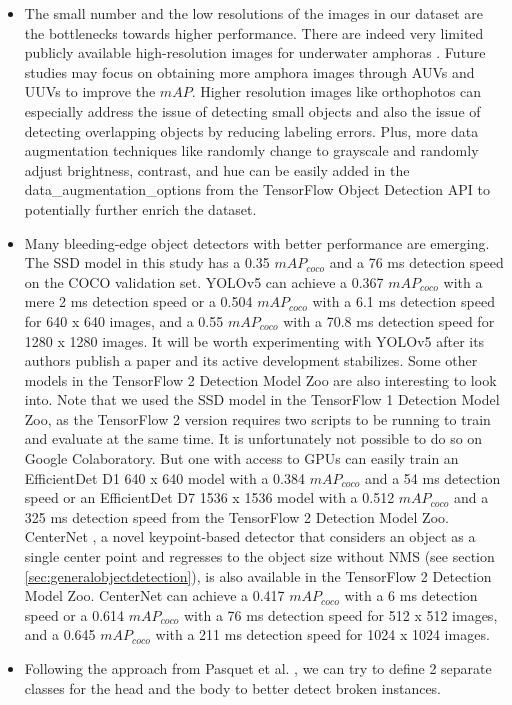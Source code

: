 \documentclass[a4paper, 11pt, oneside]{article}
\begin{document}
\begin{itemize}
  \item The small number and the low resolutions of the images in our dataset are the bottlenecks towards higher
  performance. There are indeed very limited publicly available high-resolution images for underwater amphoras
  \cite{pasquet2017amphora}. Future studies may focus on obtaining more amphora images through AUVs and UUVs to improve
  the $mAP$. Higher resolution images like orthophotos can especially address the issue of detecting
  small objects \cite{kisantal2019augmentation} and also the issue of detecting overlapping objects by reducing labeling
  errors. Plus, more data augmentation techniques like randomly change to grayscale and randomly adjust brightness,
  contrast, and hue can be easily added in the data\_augmentation\_options from the TensorFlow Object Detection API
  to potentially further enrich the dataset.
  \item Many bleeding-edge object detectors with better performance are emerging. The SSD model in this study
  has a 0.35 $mAP_{coco}$ and a 76 ms detection speed on the COCO validation set. YOLOv5 can achieve a 0.367
  $mAP_{coco}$ with a mere 2 ms detection speed or a 0.504 $mAP_{coco}$ with a 6.1 ms detection speed for 640 x 640 images,
  and a 0.55 $mAP_{coco}$ with a 70.8 ms detection speed for 1280 x 1280 images. It will be worth experimenting with
  YOLOv5 after its authors publish a paper and its active development stabilizes. Some other models in the TensorFlow 2
  Detection Model Zoo \cite{tf2detectionmodelzoo} are also interesting to look into. Note that we used the SSD
  model in the TensorFlow 1 Detection Model Zoo, as the TensorFlow 2 version requires two scripts to be running
  to train and evaluate at the same time. It is unfortunately not possible to do so on Google Colaboratory. But one with
  access to GPUs can easily train an EfficientDet \cite{tan2020efficientdet} D1 640 x 640 model with a 0.384 $mAP_{coco}$
  and a 54 ms detection speed or an EfficientDet D7 1536 x 1536 model with a 0.512 $mAP_{coco}$ and a 325 ms detection
  speed from the TensorFlow 2 Detection Model Zoo. CenterNet \cite{zhou2019objects}, a novel keypoint-based detector that
  considers an object as a single center point and regresses to the object size without NMS
  (see section \ref{sec:generalobjectdetection}), is also available in the TensorFlow 2 Detection Model Zoo. CenterNet
  can achieve a 0.417 $mAP_{coco}$ with a 6 ms detection speed or a 0.614 $mAP_{coco}$ with a 76 ms detection
  speed for 512 x 512 images, and a 0.645 $mAP_{coco}$ with a 211 ms detection speed for 1024 x 1024 images.
  \item Following the approach from Pasquet et al. \cite{pasquet2017amphora}, we can try to define 2 separate classes
  for the head and the body to better detect broken instances.
\end{itemize}

\newpage

\printbibliography
\end{document}
